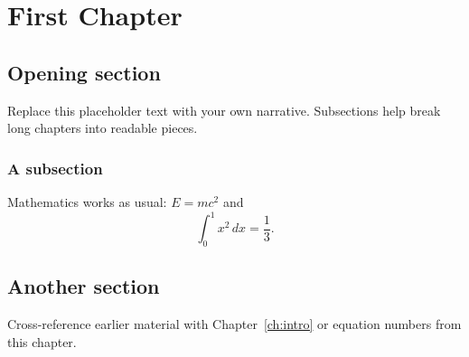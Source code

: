 \chapter{First Chapter}
\label{ch:one}

\section{Opening section}
Replace this placeholder text with your own narrative.
Subsections help break long chapters into readable pieces.

\subsection{A subsection}
Mathematics works as usual: $E = mc^2$ and
\begin{equation}
  \int_0^1 x^2 \, dx = \frac{1}{3}.
\end{equation}

\section{Another section}
Cross-reference earlier material with Chapter~\ref{ch:intro} or equation numbers from this chapter.
